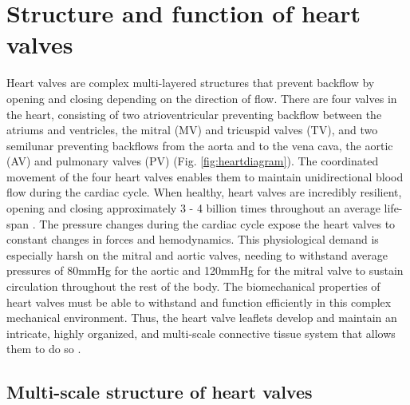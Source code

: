 \section{Structure and function of heart valves}
    
    Heart valves are complex multi-layered structures that prevent backflow by opening and closing depending on the direction of flow. There are four valves in the heart, consisting of two atrioventricular preventing backflow between the atriums and ventricles, the mitral (MV) and tricuspid valves (TV), and two semilunar preventing backflows from the aorta and to the vena cava, the aortic (AV) and pulmonary valves (PV) (Fig. \ref{fig:heartdiagram}). The coordinated movement of the four heart valves enables them to maintain unidirectional blood flow during the cardiac cycle. When healthy, heart valves are incredibly resilient, opening and closing approximately 3 - 4 billion times throughout an average life-span \cite{sacks_biomechanics_2009}. The pressure changes during the cardiac cycle expose the heart valves to constant changes in forces and hemodynamics. This physiological demand is especially harsh on the mitral and aortic valves, needing to withstand average pressures of 80mmHg for the aortic and 120mmHg for the mitral valve to sustain circulation throughout the rest of the body. The biomechanical properties of heart valves must be able to withstand and function efficiently in this complex mechanical environment. Thus, the heart valve leaflets develop and maintain an intricate, highly organized, and multi-scale connective tissue system that allows them to do so \cite{tao_heart_2012}. 


\subsection{Multi-scale structure of heart valves}

